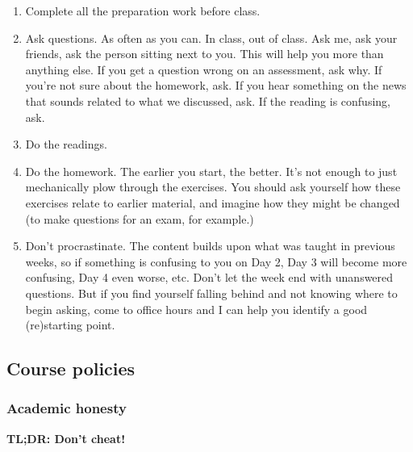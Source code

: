 \documentclass[
  letterpaper,
  DIV=11,
  numbers=noendperiod]{scrartcl}
\begin{document}
\begin{enumerate}
\def\labelenumi{\arabic{enumi}.}
\item
  Complete all the preparation work before class.
\item
  Ask questions. As often as you can. In class, out of class. Ask me,
  ask your friends, ask the person sitting next to you. This will help
  you more than anything else. If you get a question wrong on an
  assessment, ask why. If you're not sure about the homework, ask. If
  you hear something on the news that sounds related to what we
  discussed, ask. If the reading is confusing, ask.
\item
  Do the readings.
\item
  Do the homework. The earlier you start, the better. It's not enough to
  just mechanically plow through the exercises. You should ask yourself
  how these exercises relate to earlier material, and imagine how they
  might be changed (to make questions for an exam, for example.)
\item
  Don't procrastinate. The content builds upon what was taught in
  previous weeks, so if something is confusing to you on Day 2, Day 3
  will become more confusing, Day 4 even worse, etc. Don't let the week
  end with unanswered questions. But if you find yourself falling behind
  and not knowing where to begin asking, come to office hours and I can
  help you identify a good (re)starting point.
\end{enumerate}

\subsection{Course policies}\label{course-policies}

\subsubsection{Academic honesty}\label{academic-honesty}

\textbf{TL;DR: Don't cheat!}
\end{document}
